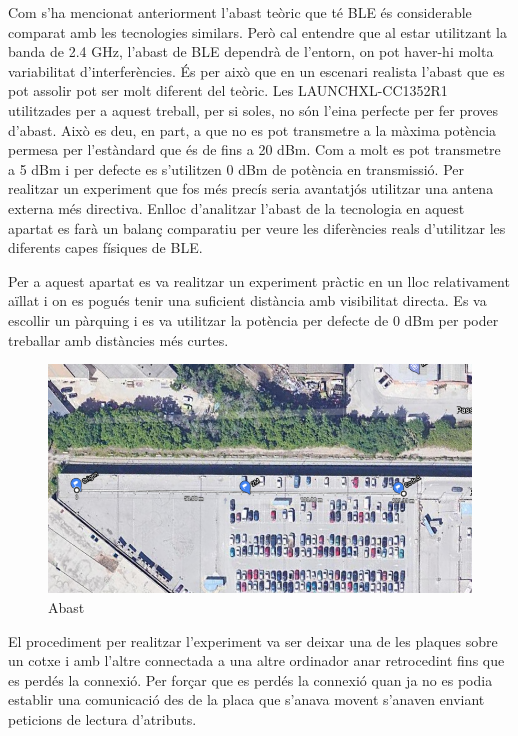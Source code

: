 Com s'ha mencionat anteriorment l'abast teòric que té BLE és considerable comparat amb les tecnologies similars.
Però cal entendre que al estar utilitzant la banda de 2.4 GHz, l'abast de BLE dependrà de l'entorn, on pot haver-hi molta variabilitat d'interferències.
És per això que en un escenari realista l'abast que es pot assolir pot ser molt diferent del teòric.
Les LAUNCHXL-CC1352R1 utilitzades per a aquest treball, per si soles, no són l'eina perfecte per fer proves d'abast.
Això es deu, en part, a que no es pot transmetre a la màxima potència permesa per l'estàndard que és de fins a 20 dBm.
Com a molt es pot transmetre a 5 dBm i per defecte es s'utilitzen 0 dBm de potència en transmissió.
Per realitzar un experiment que fos més precís seria avantatjós utilitzar una antena externa més directiva.
Enlloc d'analitzar l'abast de la tecnologia en aquest apartat es farà un balanç comparatiu per veure les diferències reals d'utilitzar les diferents capes físiques de BLE.

Per a aquest apartat es va realitzar un experiment pràctic en un lloc relativament aïllat i on es pogués tenir una suficient distància amb visibilitat directa.
Es va escollir un pàrquing i es va utilitzar la potència per defecte de 0 dBm per poder treballar amb distàncies més curtes.

\begin{figure}[!h]
	\begin{center}
		\includegraphics[width=\textwidth]{./images/prova_abast.png}
		\caption{Abast}
	\end{center}
\end{figure}

El procediment per realitzar l'experiment va ser deixar una de les plaques sobre un cotxe i amb l'altre connectada a una altre ordinador anar retrocedint fins que es perdés la connexió.
Per forçar que es perdés la connexió quan ja no es podia establir una comunicació des de la placa que s'anava movent s'anaven enviant peticions de lectura d'atributs.

